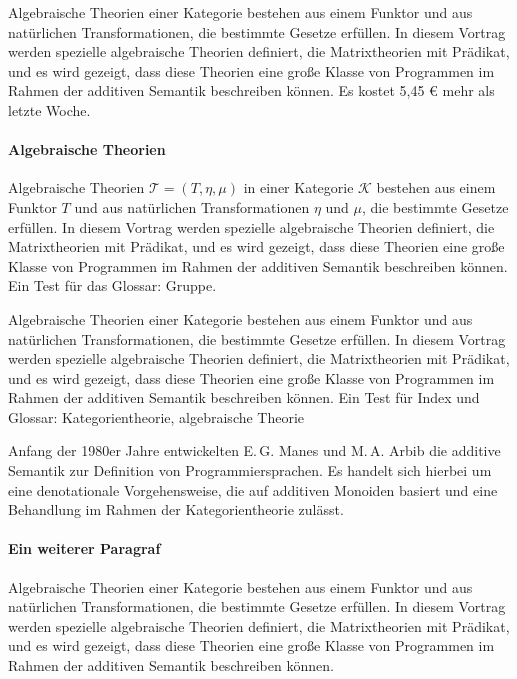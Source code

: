 Algebraische Theorien einer Kategorie bestehen aus einem Funktor und
aus natürlichen Transformationen, die bestimmte Gesetze erfüllen. In
diesem Vortrag werden spezielle algebraische Theorien definiert, die
Matrixtheorien mit Prädikat, und es wird gezeigt, dass diese Theorien
eine große Klasse von Programmen im Rahmen der additiven Semantik
beschreiben können. Es kostet 5{,}45 \euro{} mehr als letzte Woche.

\paragraph{Algebraische Theorien}

Algebraische Theorien $\mathcal{T}=(T,\eta,\mu)$ in einer Kategorie
$\mathcal{K}$ bestehen aus einem Funktor $T$ und aus natürlichen
Transformationen $\eta$ und $\mu$, die bestimmte Gesetze erfüllen. In
diesem Vortrag werden spezielle algebraische Theorien definiert, die
Matrixtheorien mit Prädikat, und es wird gezeigt, dass diese Theorien
eine große Klasse von Programmen im Rahmen der additiven Semantik
beschreiben können. Ein Test für das Glossar: Gruppe\gruppe.

Algebraische Theorien einer Kategorie bestehen aus einem Funktor und
aus natürlichen Transformationen, die bestimmte Gesetze erfüllen. In
diesem Vortrag werden spezielle algebraische Theorien definiert, die
Matrixtheorien mit Prädikat, und es wird gezeigt, dass diese Theorien
eine große Klasse von Programmen im Rahmen der additiven Semantik
beschreiben können. Ein Test für Index und Glossar:
Kategorientheorie,
algebraische Theorie\algtheorie

Anfang der 1980er Jahre entwickelten E.\,G. Manes und M.\,A. Arbib die
additive Semantik zur Definition von Programmiersprachen. Es handelt
sich hierbei um eine denotationale Vorgehensweise, die auf additiven
Monoiden basiert und eine Behandlung im Rahmen der Kategorientheorie
zulässt.

\paragraph{Ein weiterer Paragraf}

Algebraische Theorien einer Kategorie bestehen aus einem Funktor und
aus natürlichen Transformationen, die bestimmte Gesetze erfüllen. In
diesem Vortrag werden spezielle algebraische Theorien definiert, die
Matrixtheorien mit Prädikat, und es wird gezeigt, dass diese Theorien
eine große Klasse von Programmen im Rahmen der additiven Semantik
beschreiben können.


